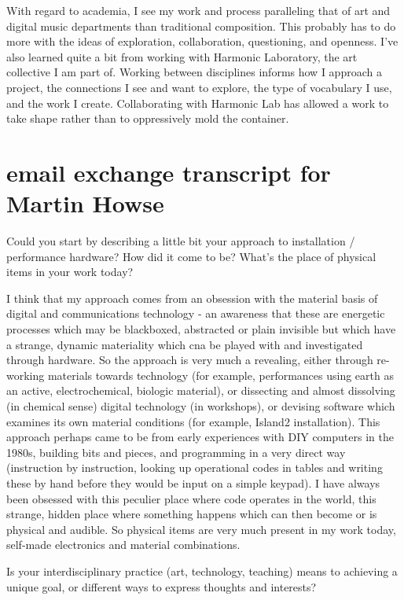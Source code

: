 With regard to academia, I see my work and process paralleling that of art and digital music departments than traditional composition. This probably has to do more with the ideas of exploration, collaboration, questioning, and openness. I've also learned quite a bit from working with Harmonic Laboratory, the art collective I am part of. Working between disciplines informs how I approach a project, the connections I see and want to explore, the type of vocabulary I use, and the work I create. Collaborating with Harmonic Lab has allowed a work to take shape rather than to oppressively mold the container.

\section{email exchange transcript for Martin Howse}

Could you start by describing a little bit your approach to
installation / performance hardware? How did it come to be? What's the
place of physical items in your work today?

I think that my approach comes from an obsession with the material
basis of digital and communications technology - an awareness that
these are energetic processes which may be blackboxed, abstracted or
plain invisible but which have a strange, dynamic materiality which
cna be played with and investigated through hardware. So the approach
is very much a revealing, either through re-working materials towards
technology (for example, performances using earth as an active,
electrochemical, biologic material), or dissecting and almost
dissolving (in chemical sense) digital technology (in workshops), or
devising software which examines its own material conditions (for
example, Island2 installation). This approach perhaps came to be from
early experiences with DIY computers in the 1980s, building bits and
pieces, and programming in a very direct way (instruction by
instruction, looking up operational codes in tables and writing these
by hand before they would be input on a simple keypad). I have always
been obsessed with this peculier place where code operates in the
world, this strange, hidden place where something happens which can
then become or is physical and audible. So physical items are very
much present in my work today, self-made electronics and material
combinations.


Is your interdisciplinary practice (art, technology, teaching) means
to achieving a unique goal, or different ways to express thoughts and
interests?

